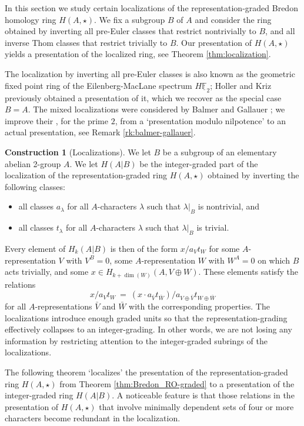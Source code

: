 \documentclass{amsart}[12pt]
\newcommand{\mF}{{\mathbb F}}
\numberwithin{equation}{section}
\theoremstyle{definition}
\newtheorem{construction}[equation]{Construction}
\begin{document}
In this section we study certain localizations of the representation-graded
Bredon homology ring $H(A,\star)$.
We fix a subgroup $B$ of $A$ and consider the ring
obtained by inverting all pre-Euler classes that restrict nontrivially to $B$,
and all inverse Thom classes that restrict trivially to $B$.
Our presentation of $H(A,\star)$ yields a presentation
of the localized ring, see Theorem \ref{thm:localization}.

The localization by inverting all pre-Euler classes is also known as the
geometric fixed point ring of the Eilenberg-MacLane spectrum $H\underline\mF_2$;
Holler and Kriz \cite{holler-kriz} previously obtained a presentation
of it, which we recover as the special case $B=A$.
The mixed localizations were considered by Balmer and Gallauer \cite{balmer-gallauer};
we improve their \cite[Theorem 8.13]{balmer-gallauer},
for the prime $2$, from a `presentation modulo nilpotence' to
an actual presentation, see Remark \ref{rk:balmer-gallauer}.


\begin{construction}[Localizations]\label{con:invert classes}
  We let $B$ be a subgroup of an elementary abelian 2-group $A$.
  We let $H(A|B)$ be the integer-graded part of the localization
  of the representation-graded ring $H(A,\star)$ obtained by inverting the following classes:
  \begin{itemize}
  \item all classes $a_\lambda$ for all $A$-characters $\lambda$ such that $\lambda|_B$
    is nontrivial, and
  \item all classes $t_\lambda$ for all $A$-characters $\lambda$ such that $\lambda|_B$
    is trivial.
  \end{itemize}
  Every element of $H_k(A|B)$ is then of the form $x/a_V t_W$
  for some $A$-representation $V$ with $V^B=0$,
  some $A$-representation $W$ with $W^A=0$ on which $B$ acts trivially,
  and some $x\in H_{k+\dim(W)}(A,V\oplus W)$.
  These elements satisfy the relations
  \[ x/a_Vt_W \ = \  (x\cdot a_{\bar V} t_{\bar W})/a_{V\oplus \bar V}t_{W\oplus \bar W} \]
  for all $A$-representations $\bar V$ and $\bar W$  with the corresponding properties.
  The localizations introduce enough graded units so that the representation-grading
  effectively collapses to an integer-grading. In other words, we are not losing any
  information by restricting attention to the integer-graded subrings of the localizations.
\end{construction}  

The following theorem `localizes' the presentation of
the representation-graded ring $H(A,\star)$ from Theorem \ref{thm:Bredon_RO-graded}
to a presentation of the integer-graded ring $H(A|B)$.
A noticeable feature is that those relations in the presentation of $H(A,\star)$
that involve minimally dependent sets of four or more characters
become redundant in the localization.
\end{document}
